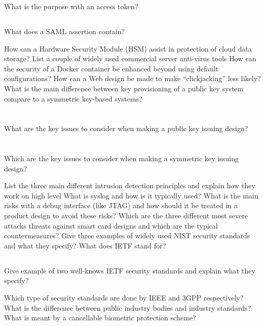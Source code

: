 \begin{questions}
\question{} What is the purpose with an access token?
  \begin{parts}
  \part{} What does a SAML assertion contain?
  \end{parts}

\question{} How can a Hardware Security Module (HSM) assist in protection of cloud data storage?
\question{} List a couple of widely used commercial server anti-virus tools
\question{} How can the security of a Docker container be enhanced beyond using default configurations?
\question{} How can a Web design be made to make ``clickjacking'' less likely?
\question{} What is the main difference between key provisioning of a public key system compare to a symmetric key-based systems?
  \begin{parts}
  \part{} What are the key issues to consider when making a public key issuing design?
  \part{} Which are the key issues to consider when making a symmetric key issuing design?
  \end{parts}

\question{} List the three main different intrusion detection principles and explain how they work on high level
\question{} What is syslog and how is it typically used?
\question{} What is the main risks with a debug interface (like JTAG) and how should it be treated in a product design to avoid these risks?
\question{} Which are the three different most severe attacks threats against smart card designs and which are the typical countermeasures?
\question{} Give three examples of widely used NIST security standards and what they specify?
\question{} What does IETF stand for?
  \begin{parts}
  \part{} Give example of two well-knows IETF security standards and explain what they specify?
  \end{parts}

\question{} Which type of security standards are done by IEEE and 3GPP respectively?
\question{} What is the difference between public industry bodies and industry standards?
\question{} What is meant by a cancellable biometric protection scheme?
  \begin{parts}

\end{parts}
\end{questions}
